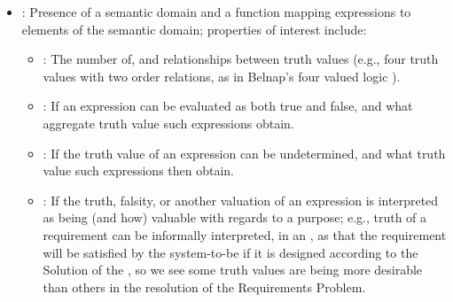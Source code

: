 \documentclass[10pt, final, conference, compsocconf]{IEEEtran}
\begin{document}
\begin{itemize}
{\begin{itemize}
\end{itemize}}
\item{: Presence of a semantic domain and a function mapping expressions to elements of the semantic domain; properties of interest include:
\begin{itemize}
\item{: The number of, and relationships between truth values (e.g., four truth values with two order relations, as in Belnap's four valued logic \cite{Belnap:1977}).}
\item{: If an expression can be evaluated as both true and false, and what aggregate truth value such expressions obtain.}
\item{: If the truth value of an expression can be undetermined, and what truth value such expressions then obtain.}
\item{: If the truth, falsity, or another valuation of an expression is interpreted as being (and how) valuable with regards to a purpose; e.g., truth of a requirement can be informally interpreted, in an , as that the requirement will be satisfied by the system-to-be if it is designed according to the Solution of the , so we see some truth values are being more desirable than others in the resolution of the Requirements Problem.}
\end{itemize}}
\end{itemize}



\end{document}
